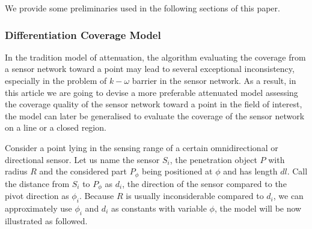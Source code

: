 We provide some preliminaries used in the following sections of this paper.
\subsubsection{Differentiation Coverage Model}
In the tradition model of attenuation, the algorithm evaluating the coverage from a sensor network toward a point may lead to several exceptional inconsistency, especially in the problem of $k-\omega$ barrier in the sensor network. As a result, in this article we are going to devise a more preferable attenuated model assessing the coverage quality of the sensor network toward a point in the field of interest, the model can later be generalised to evaluate the coverage of the sensor network on a line or a closed region.

Consider a point lying in the sensing range of a certain omnidirectional  or directional sensor. Let us name the sensor $S_i$, the penetration object $P$ with radius $R$ and the considered part $P_\phi$ being positioned at $\phi$ and has length $dl$. Call the distance from $S_i$ to $P_\phi$ as $d_i$, the direction of the sensor compared to the pivot direction as $\phi_i$. Because $R$ is usually inconsiderable compared to $d_i$, we can approximately use $\phi_i$ and $d_i$ as constants with variable $\phi$, the model will be now illustrated as followed.

